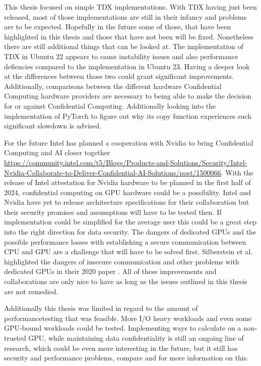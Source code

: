 
This thesis focused on simple TDX implementations. With TDX having just been released, most of those implementations are still in their infancy and problems are to be expected. Hopefully in the future some of those, that have been highlighted in this thesis and those that have not been will be fixed. Nonetheless there are still additional things that can be looked at. The implementation of TDX in Ubuntu 22 appears to cause instability issues and also performance defiencies compared to the implementation in Ubuntu 23. Having a deeper look at the differences between those two could grant significant improvements. Additionally, comparisons between the different hardware Confidential Computing hardware providers are necessary to being able to make the decision for or against Confidential Computing. Additionally looking into the implementation of PyTorch to figure out why its copy function experiences such significant slowdown is advised. 

For the future Intel has planned a cooperation with Nvidia to bring Confidential Computing and AI closer together \url{https://community.intel.com/t5/Blogs/Products-and-Solutions/Security/Intel-Nvidia-Collaborate-to-Deliver-Confidential-AI-Solutions/post/1500066}. With the release of Intel attestation for Nvidia hardware to be planned in the first half of 2024, confidential computing on GPU hardware could be a possibility. Intel and Nvidia have yet to release architecture specifications for their collaboration but their security promises and assumptions will have to be tested then. If implementation could be simplified for the average user this could be a great step into the right direction for data security. The dangers of dedicated GPUs and the possible performance losses with establishing a secure communication between CPU and GPU are a challenge that will have to be solved first. Silberstein et al. highlighted the dangers of insecure communication and other problems with dedicated GPUs in their 2020 paper \cite{zhu_enabling_2020}. All of these improvements and collaborations are only nice to have as long as the issues outlined in this thesis are not remedied.

Additionally this thesis was limited in regard to the amount of performancetesting that was feasible. More I/O heavy workloads and even some GPU-bound workloads could be tested. Implementing ways to calculate on a non-trusted GPU, while maintaining data confidentiality is still an ongoing line of research, which could be even more interesting in the future, but it still has security and performance problems, compare \cite{ogburn_homomorphic_2013} and \cite{li_security_2020} for more information on this.

